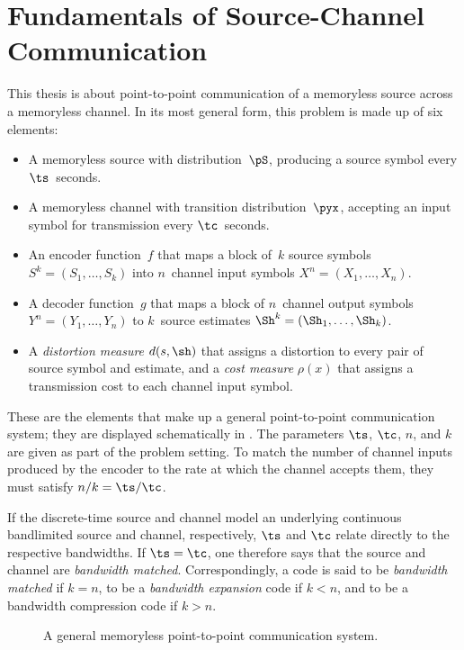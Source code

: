 \chapter{Fundamentals of Source-Channel Communication}

This thesis is about point-to-point communication of a memoryless source across
a memoryless channel. In its most general form, this problem is made up of six
elements:
\begin{itemize}
  \item A memoryless source with distribution~$\pS$, producing a source symbol
    every $\ts$~seconds.
  \item A memoryless channel with transition distribution~$\pyx$, accepting an
    input symbol for transmission every $\tc$~seconds.
  \item An encoder function~$f$ that maps a block of~$k$ source symbols $S^k
    = (S_1, \dots, S_k)$ into $n$~channel input symbols $X^n = (X_1,
    \dots, X_n)$.
  \item A decoder function~$g$ that maps a block of $n$~channel output symbols
    $Y^n = (Y_1, \dots, Y_n)$ to $k$~source estimates $\Sh^k = (\Sh_1,
    \dots, \Sh_k)$.
  \item A \emph{distortion measure} $d(s,\sh)$ that assigns a distortion to
    every pair of source symbol and estimate, and a \emph{cost measure}
    $\rho(x)$ that assigns a transmission cost to each channel input symbol. 
\end{itemize}
These are the elements that make up a general point-to-point communication
system;  they are displayed schematically in . The parameters
$\ts$, $\tc$, $n$, and $k$ are given as part of the problem setting. To match
the number of channel inputs produced by the encoder to the rate at which the
channel accepts them, they must satisfy $n/k = \ts / \tc$. 

If the discrete-time source and channel model an underlying continuous
bandlimited source and channel, respectively, $\ts$ and $\tc$ relate directly to
the respective bandwidths. If $\ts = \tc$, one therefore says that the source
and channel are \emph{bandwidth matched}. Correspondingly, a code is said to be
\emph{bandwidth matched} if $k=n$, to be a \emph{bandwidth expansion} code if $k
< n$, and to be a bandwidth compression code if $k > n$.

\begin{figure}
  \begin{center}
    
  \end{center}
  \caption{A general memoryless point-to-point communication system.}
  \label{fig:scgen}
\end{figure}

